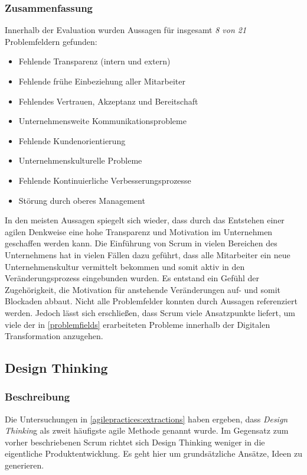 \todots

\subsubsection{Zusammenfassung}

Innerhalb der Evaluation wurden Aussagen für insgesamt \textit{8 von 21} Problemfeldern gefunden:

\begin{itemize}[noitemsep, topsep=0pt]
	\item Fehlende Transparenz (intern und extern)
	\item Fehlende frühe Einbeziehung aller Mitarbeiter
	\item Fehlendes Vertrauen, Akzeptanz und Bereitschaft
	\item Unternehmensweite Kommunikationsprobleme
	\item Fehlende Kundenorientierung
	\item Unternehmenskulturelle Probleme
	\item Fehlende Kontinuierliche Verbesserungsprozesse
	\item Störung durch oberes Management
\end{itemize}

In den meisten Aussagen spiegelt sich wieder, dass durch das Entstehen einer agilen Denkweise eine hohe Transparenz und Motivation im Unternehmen geschaffen werden kann. Die Einführung von Scrum in vielen Bereichen des Unternehmens hat in vielen Fällen dazu geführt, dass alle Mitarbeiter ein neue Unternehmenskultur vermittelt bekommen und somit aktiv in den Veränderungsprozess eingebunden wurden. Es entstand ein Gefühl der Zugehörigkeit, die Motivation für anstehende Veränderungen auf- und somit Blockaden abbaut. Nicht alle Problemfelder konnten durch Aussagen referenziert werden. Jedoch lässt sich erschließen, dass Scrum viele Ansatzpunkte liefert, um viele der in \ref{problemfields} erarbeiteten Probleme innerhalb der Digitalen Transformation anzugehen.

\subsection{Design Thinking}

\subsubsection{Beschreibung}

Die Untersuchungen in \ref{agilepractices:extractions} haben ergeben, dass \textit{Design Thinkin}g als zweit häufigste agile Methode genannt wurde. Im Gegensatz zum vorher beschriebenen Scrum richtet sich Design Thinking weniger in die eigentliche Produktentwicklung. Es geht hier um grundsätzliche Ansätze, Ideen zu generieren.

